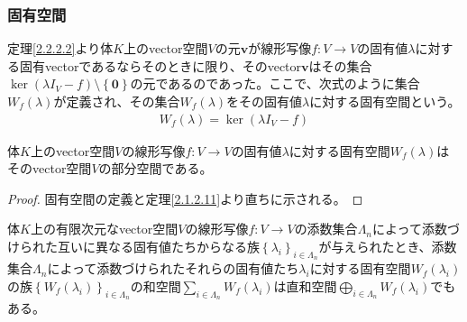 \documentclass[dvipdfmx]{jsarticle}
\begin{document}
\subsubsection{固有空間}%
\begin{dfn} 定理\ref{2.2.2.2}より体$K$上のvector空間$V$の元$\mathbf{v}$が線形写像$f:V \rightarrow V$の固有値$\lambda$に対する固有vectorであるならそのときに限り、そのvector$\mathbf{v}$はその集合$\ker\left( \lambda I_{V} - f \right) \setminus \left\{ \mathbf{0} \right\}$の元であるのであった。ここで、次式のように集合$W_{f}(\lambda)$が定義され、その集合$W_{f}(\lambda)$をその固有値$\lambda$に対する固有空間という。
\begin{align*}
W_{f}(\lambda) = \ker\left( \lambda I_{V} - f \right)
\end{align*}
\end{dfn}
\begin{thm}\label{2.2.2.14}
体$K$上のvector空間$V$の線形写像$f:V \rightarrow V$の固有値$\lambda$に対する固有空間$W_{f}(\lambda)$はそのvector空間$V$の部分空間である。
\end{thm}
\begin{proof} 固有空間の定義と定理\ref{2.1.2.11}より直ちに示される。
\end{proof}
\begin{thm}\label{2.2.2.15}
体$K$上の有限次元なvector空間$V$の線形写像$f:V \rightarrow V$の添数集合$\varLambda_{n}$によって添数づけられた互いに異なる固有値たちからなる族$\left\{ \lambda_{i} \right\}_{i \in \varLambda_{n}}$が与えられたとき、添数集合$\varLambda_{n}$によって添数づけられたそれらの固有値たち$\lambda_{i}$に対する固有空間$W_{f}\left( \lambda_{i} \right)$の族$\left\{ W_{f}\left( \lambda_{i} \right) \right\}_{i \in \varLambda_{n}}$の和空間$\sum_{i \in \varLambda_{n}} {W_{f}\left( \lambda_{i} \right)}$は直和空間$\bigoplus_{i \in \varLambda_{n}} {W_{f}\left( \lambda_{i} \right)}$でもある。
\end{thm}
\end{document}

